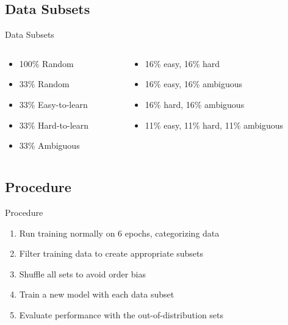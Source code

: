\documentclass[
	11pt,
]{beamer}
\begin{document}
\subsection{Data Subsets}
\begin{frame}{Data Subsets}
	\begin{columns}
		\begin{column}{.4\textwidth}
			\begin{itemize}
				\item 100\% Random
				\item  33\% Random
				      \vspace{1cm}
				\item 33\% Easy-to-learn
				\item 33\% Hard-to-learn
				\item 33\% Ambiguous
			\end{itemize}
		\end{column}
		\begin{column}{.6\textwidth}
			\begin{itemize}
				\fontsize{11pt}{20pt}\selectfont
				\item 16\% easy, 16\% hard
				\item 16\% easy, 16\% ambiguous
				\item 16\% hard, 16\% ambiguous
				\item 11\% easy, 11\% hard, 11\% ambiguous
			\end{itemize}

		\end{column}
	\end{columns}
\end{frame}


\subsection{Procedure}
\begin{frame}[t]{Procedure}
	\vspace{.5cm}
	\begin{enumerate}
		\fontsize{11pt}{20pt}\selectfont
		\item Run training normally on 6 epochs, categorizing data
		\item Filter training data to create appropriate subsets
		\item Shuffle all sets to avoid order bias
		\item Train a new model with each data subset
		\item Evaluate performance with the out-of-distribution sets
	\end{enumerate}
\end{frame}
\end{document}

